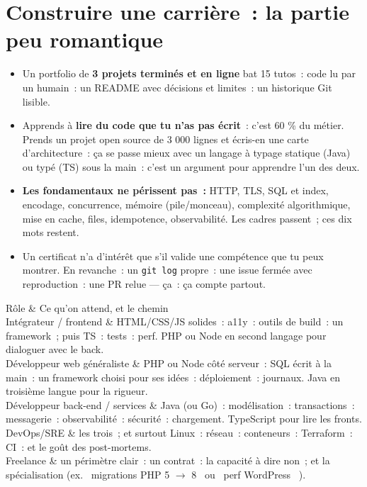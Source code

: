 \section{Construire une carri\`ere~: la partie peu romantique}

\begin{itemize}
  \item Un portfolio de \textbf{3 projets termin\'es et en ligne} bat 15 tutos~: code lu par un
        humain~: un README avec d\'ecisions et limites~: un historique Git lisible.
  \item Apprends \`a \textbf{lire du code que tu n'as pas \'ecrit}~: c'est 60 \% du m\'etier. Prends un
        projet open source de 3 000 lignes et \'ecris-en une carte d'architecture~: \c{c}a se passe
        mieux avec un langage \`a typage statique (Java) ou typ\'e (TS) sous la main~: c'est un
        argument pour apprendre l'un des deux.
  \item \textbf{Les fondamentaux ne p\'erissent pas~:} HTTP, TLS, SQL et index, encodage,
        concurrence, m\'emoire (pile/monceau), complexit\'e algorithmique, mise en cache, files,
        idempotence, observabilit\'e. Les cadres passent~; ces dix mots restent.
  \item Un certificat n'a d'int\'er\^et que s'il valide une comp\'etence que tu peux montrer.
        En revanche~: un \verb|git log| propre~: une issue ferm\'ee avec reproduction~: une PR
        relue --- \c{c}a~: \c{c}a compte partout.
\end{itemize}

\begin{tablez}[p{0.2\textwidth}X]
  \headrow R\^ole \& Ce qu'on attend, et le chemin \\
  \midrule
  Int\'egrateur / frontend \& HTML/CSS/JS solides~: a11y~: outils de build~: un framework~; puis TS~: tests~: perf. PHP ou Node en second langage pour dialoguer avec le back. \\
  D\'eveloppeur web g\'en\'eraliste \& PHP ou Node c\^ot\'e serveur~: SQL \'ecrit \`a la main~: un framework choisi pour ses id\'ees~: d\'eploiement~: journaux. Java en troisi\`eme langue pour la rigueur. \\
  D\'eveloppeur back-end / services \& Java (ou Go)~: mod\'elisation~: transactions~: messagerie~: observabilit\'e~: s\'ecurit\'e~: chargement. TypeScript pour lire les fronts. \\
  DevOps/SRE \& les trois~; et surtout Linux~: r\'eseau~: conteneurs~: Terraform~: CI~: et le go\^ut des post-mortems. \\
  Freelance \& un p\'erim\`etre clair~: un contrat~: la capacit\'e \`a dire non~; et la sp\'ecialisation (ex. \og ~migrations PHP 5 $\rightarrow$ 8~ \fg{} ou \og ~perf WordPress~ \fg{}). \\
\end{tablez}

